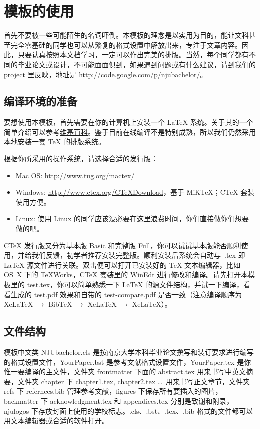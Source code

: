 \chapter{模板的使用}
首先不要被一些可能陌生的名词吓倒。本模板的理念是以实用为目的，能让文科甚至完全零基础的同学也可以从繁复的格式设置中解放出来，专注于文章内容。因此，只要认真按照本文档学习，一定可以作出完美的排版。当然，每个同学都有不同的毕业论文或设计，不可能面面俱到，如果遇到问题或有什么建议，请到我们的 project 里反映，地址是 \url{http://code.google.com/p/njubachelor/}。

\section{编译环境的准备}
要想使用本模板，首先需要在你的计算机上安装一个 LaTeX 系统。关于其的一个简单介绍可以参考\href{http://zh.wikipedia.org/wiki/Latex}{维基百科}。鉴于目前在线编译不是特别成熟，所以我们仍然采用本地安装一套 \TeX{} 的排版系统。

根据你所采用的操作系统，请选择合适的发行版：
\begin{itemize}\label{text:eg}
	\item Mac OS: \url{http://www.tug.org/mactex/}
	\item Windows: \url{http://www.ctex.org/CTeXDownload}，基于 MiKTeX；CTeX 套装使用方便。
	\item Linux: 使用 Linux 的同学应该没必要在这里浪费时间，你们直接做你们想要做的吧。
\end{itemize}
CTeX 发行版又分为基本版 Basic 和完整版 Full，你可以试试基本版能否顺利使用，并给我们反馈，初学者推荐安装完整版。顺利安装后系统会自动与\ .tex 即 LaTeX 源文件进行关联。双击便可以打开已安装好的 \TeX{} 文本编辑器，比如 \mbox{OS X} 下的 TeXWorks，CTeX 套装里的 WinEdt 进行修改和编译。请先打开本模板里的 test.tex，你可以简单熟悉一下 LaTeX 的源文件结构，并试一下编译，看看生成的 test.pdf 效果和自带的 test-compare.pdf 是否一致（注意编译顺序为 XeLaTeX $\rightarrow$ BibTeX $\rightarrow$ XeLaTeX $\rightarrow$ XeLaTeX）。

\section{文件结构}
模板中文类 NJUbachelor.cls 是按南京大学本科毕业论文撰写和装订要求进行编写的格式设置文件，YourPaper.bst 是参考文献格式设置文件，YourPaper.tex 是你惟一要编译的主文件，文件夹 frontmatter 下面的 abstract.tex 用来书写中英文摘要，文件夹 chapter 下 chapter1.tex, chapter2.tex \ldots~用来书写正文章节，文件夹 refs 下 refernces.bib 管理参考文献，figures 下保存所有要插入的图片，backmatter 下 acknowledgment.tex 和 appendices.tex 分别是致谢和附录，njulogos 下存放封面上使用的学校标志。.cls、.bst、.tex、.bib 格式的文件都可以用文本编辑器或合适的软件打开。


